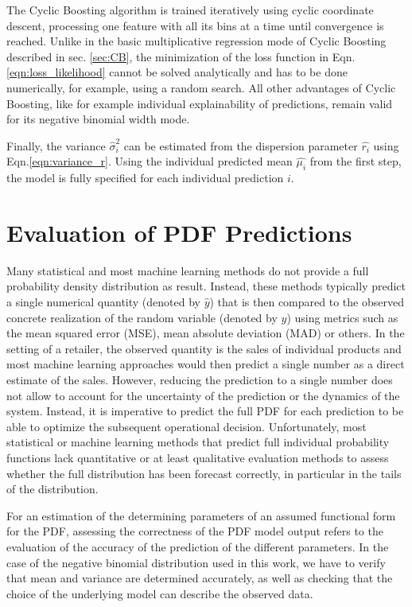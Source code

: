 \documentclass[BCOR=1mm, DIV=calc,10pt,
twoside=true,
twocolumn,
headings=normal]{scrartcl}
\newcommand{\eqn}{Eqn.}
\begin{document}
The Cyclic Boosting algorithm is trained iteratively using cyclic coordinate descent, processing one feature with all its bins at a time until convergence is reached. Unlike in the basic multiplicative regression mode of Cyclic Boosting described in sec. \ref{sec:CB}, the minimization of the loss function in \eqn \eqref{eqn:loss_likelihood} cannot be solved analytically and has to be done numerically, for example, using a random search. All other advantages of Cyclic Boosting, like for example individual explainability of predictions, remain valid for its negative binomial width mode.

Finally, the variance $\hat{\sigma}^2_i$ can be estimated from the dispersion parameter $\hat{r_i}$ using \eqn \eqref{eqn:variance_r}. Using  the individual predicted mean $\hat{\mu_i}$ from the first step, the model is fully specified for each individual prediction $i$.


\section{Evaluation of PDF Predictions}
\label{sec:pdfEvaluation}

Many statistical and most machine learning methods do not provide a full probability density distribution as result. Instead, these methods typically predict a single numerical quantity (denoted by $\hat{y}$) that is then compared to the observed concrete realization of the random variable (denoted by $y$) using metrics such as the mean squared error (MSE), mean absolute deviation (MAD) or others. In the setting of a retailer, the observed quantity is the sales of individual products and most machine learning approaches would then predict a single number as a direct estimate of the sales. However, reducing the prediction to a single number does not allow to account for the uncertainty of the prediction or the dynamics of the system. Instead, it is imperative to predict the full PDF for each prediction to be able to optimize the subsequent operational decision. Unfortunately, most statistical or machine learning methods that predict full individual probability functions lack quantitative or at least qualitative evaluation methods to assess whether the full distribution has been forecast correctly, in particular in the tails of the distribution.

For an estimation of the determining parameters of an assumed functional form for the PDF, assessing the correctness of the PDF model output refers to the evaluation of the accuracy of the prediction of the different parameters. In the case of the negative binomial distribution used in this work, we have to verify that mean and variance are determined accurately, as well as checking that the choice of the underlying model can describe the observed data.
\end{document}
